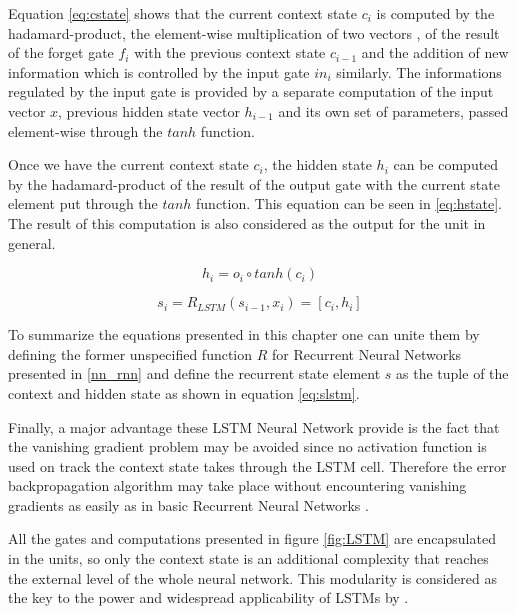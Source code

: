 Equation \ref{eq:cstate} shows that the current context state $c_i$ is computed by the hadamard-product, the element-wise multiplication of two vectors \citep{goldberg2017neural}, of the result of the forget gate $f_i$ with the previous context state $c_{i-1}$ and the addition of new information  which is controlled by the input gate $in_i$ similarly. The informations regulated by the input gate is provided by a separate computation of the input vector $x$, previous hidden state vector $h_{i-1}$ and its own set of parameters, passed element-wise through the $tanh$ function.

Once we have the current context state $c_i$, the hidden state $h_i$ can be computed by the hadamard-product of the result of the output gate with the current state element put through the $tanh$ function. This equation can be seen in \ref{eq:hstate}. The result of this computation is also considered as the output for the unit in general.


\begin{equation}
\label{eq:hstate}
    h_i = o_i \circ tanh(c_i)
\end{equation}

\begin{equation}
\label{eq:slstm}
    s_i = R_{LSTM}(s_{i-1}, x_i) = [c_i, h_i]
\end{equation}


To summarize the equations presented in this chapter one can unite them by defining the former unspecified function $R$ for Recurrent Neural Networks presented in \ref{nn_rnn} and define the recurrent state element $s$ as the tuple of the context and hidden state as shown in equation \ref{eq:slstm}.


Finally, a major advantage these LSTM Neural Network provide is the fact that the vanishing gradient problem may be avoided since no activation function is used on track the context state takes through the LSTM cell. Therefore the error backpropagation algorithm may take place without encountering vanishing gradients as easily as in basic Recurrent Neural Networks \citep{embedding2020pilehvar}.

All the gates and computations presented in figure \ref{fig:LSTM} are encapsulated in the units, so only the context state is an additional complexity that reaches the external level of the whole neural network. This modularity is considered as the key to the power and widespread applicability of LSTMs by \citet{jurafsky2021}.